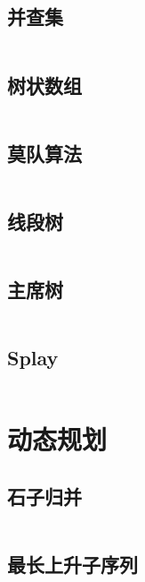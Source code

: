 \documentclass[a4paper]{article}
\newcommand{\cppcode}[1]{
    \inputminted[mathescape]{cpp}{#1}
}
\begin{document}
\cppcode{data-structure/SparseTable.cpp}

\subsection{并查集}

\cppcode{data-structure/Union-Find.cpp}


\subsection{树状数组}

\cppcode{data-structure/BIT.cpp}

\subsection{莫队算法}

\cppcode{data-structure/Mo-algorithm.cpp}

\subsection{线段树}

\cppcode{data-structure/segment-tree(xiaodao).cpp}

\subsection{主席树}

\cppcode{data-structure/persistent-segment-tree.cpp}


\subsection{Splay}

\cppcode{data-structure/Splay(Menci).cpp}





\section{动态规划}

\subsection{石子归并}

\cppcode{dynamic-programming/Stone-Merge.cpp}

\subsection{最长上升子序列}
\end{document}
